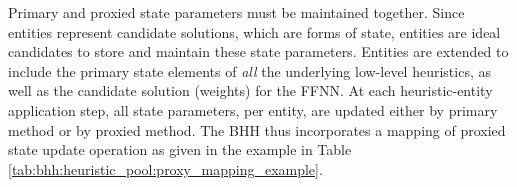 Primary and proxied state parameters must be maintained together. Since entities represent candidate solutions, which are forms of state, entities are ideal candidates to store and maintain these state parameters. Entities are extended to include the primary state elements of \textit{all} the underlying low-level heuristics, as well as the candidate solution (weights) for the \acs{FFNN}. At each heuristic-entity application step, all state parameters, per entity, are updated either by primary method or by proxied method. The \acs{BHH} thus incorporates a mapping of proxied state update operation as given in the example in Table \ref{tab:bhh:heuristic_pool:proxy_mapping_example}.

\begin{table}[htbp]
      \centering
      \caption{An example of mapping of proxied state update operation maintained by the \acs{BHH}.}
      \label{tab:bhh:heuristic_pool:proxy_mapping_example}%
      \par\bigskip
\end{table}%

